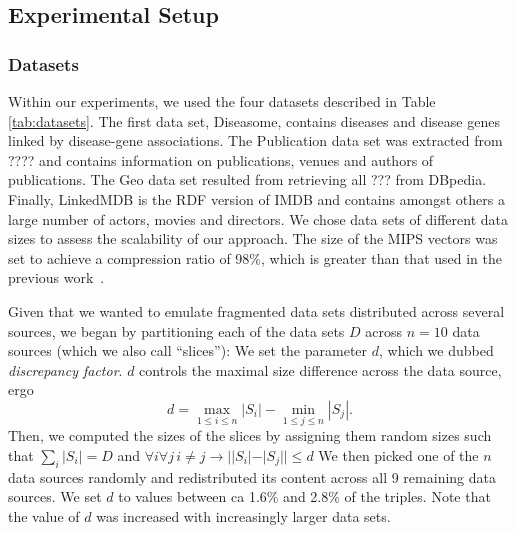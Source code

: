\documentclass{sig-alternate}  %
\begin{document}
\subsection{Experimental Setup}

\subsubsection{Datasets}
Within our experiments, we used the four datasets described in Table \ref{tab:datasets}.
The first data set, Diseasome, contains diseases and disease genes linked by disease-gene associations.
The Publication data set was extracted from ???? and contains information on publications, venues and authors of publications.
The Geo data set resulted from retrieving all ??? from DBpedia.
Finally, LinkedMDB is the RDF version of IMDB and contains amongst others a large number of actors, movies and directors.
We chose data sets of different data sizes to assess the scalability of our approach.
The size of the MIPS vectors was set to achieve a compression ratio of 98\%, which is greater than that used in the previous work~\cite{key-5}.

Given that we wanted to emulate fragmented data sets distributed across several sources, we began by partitioning each of the data sets $D$ across $n=10$ data sources (which we also call ``slices''):
We set the parameter $d$, which we dubbed \emph{discrepancy factor}.
$d$ controls the maximal size difference across the data source, ergo
\begin{equation}
d = \max\limits_{1 \leq i \leq n} |S_i| - \min\limits_{1 \leq j \leq n} |S_j|.
\end{equation}
Then, we computed the sizes of the slices by assigning them random sizes such that $\sum\limits_{i} |S_i| = D$ and $\forall i \forall j\,i \neq j \rightarrow ||S_i| - |S_j|| \leq d$ 
We then picked one of the $n$ data sources randomly and redistributed its content across all 9 remaining data sources.
We set $d$ to values between ca 1.6\% and 2.8\% of the triples.
Note that the value of $d$ was increased with increasingly larger data sets.
\end{document}
